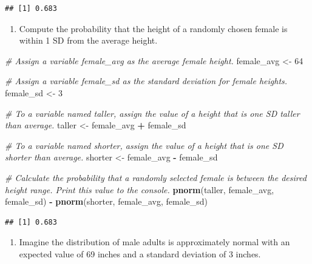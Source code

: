 \documentclass[
]{article}
\newenvironment{Shaded}{\begin{snugshade}}{\end{snugshade}}
\newcommand{\CommentTok}[1]{\textcolor[rgb]{0.56,0.35,0.01}{\textit{#1}}}
\newcommand{\DecValTok}[1]{\textcolor[rgb]{0.00,0.00,0.81}{#1}}
\newcommand{\KeywordTok}[1]{\textcolor[rgb]{0.13,0.29,0.53}{\textbf{#1}}}
\newcommand{\NormalTok}[1]{#1}
\newcommand{\OperatorTok}[1]{\textcolor[rgb]{0.81,0.36,0.00}{\textbf{#1}}}
\newcommand{\StringTok}[1]{\textcolor[rgb]{0.31,0.60,0.02}{#1}}
\providecommand{\tightlist}{%
  \setlength{\itemsep}{0pt}\setlength{\parskip}{0pt}}
\begin{document}
\begin{verbatim}
## [1] 0.683
\end{verbatim}

\begin{enumerate}
\def\labelenumi{\arabic{enumi}.}
\setcounter{enumi}{4}
\tightlist
\item
  Compute the probability that the height of a randomly chosen female is
  within 1 SD from the average height.
\end{enumerate}

\begin{Shaded}
\begin{Highlighting}[]
\CommentTok{\# Assign a variable \textquotesingle{}female\_avg\textquotesingle{} as the average female height.}
\NormalTok{female\_avg \textless{}{-}}\StringTok{ }\DecValTok{64}

\CommentTok{\# Assign a variable \textquotesingle{}female\_sd\textquotesingle{} as the standard deviation for female heights.}
\NormalTok{female\_sd \textless{}{-}}\StringTok{ }\DecValTok{3}

\CommentTok{\# To a variable named \textquotesingle{}taller\textquotesingle{}, assign the value of a height that is one SD taller than average.}
\NormalTok{taller \textless{}{-}}\StringTok{ }\NormalTok{female\_avg }\OperatorTok{+}\StringTok{ }\NormalTok{female\_sd}

\CommentTok{\# To a variable named \textquotesingle{}shorter\textquotesingle{}, assign the value of a height that is one SD shorter than average.}
\NormalTok{shorter \textless{}{-}}\StringTok{ }\NormalTok{female\_avg }\OperatorTok{{-}}\StringTok{ }\NormalTok{female\_sd}

\CommentTok{\# Calculate the probability that a randomly selected female is between the desired height range. Print this value to the console.}
\KeywordTok{pnorm}\NormalTok{(taller, female\_avg, female\_sd) }\OperatorTok{{-}}\StringTok{ }\KeywordTok{pnorm}\NormalTok{(shorter, female\_avg, female\_sd) }
\end{Highlighting}
\end{Shaded}

\begin{verbatim}
## [1] 0.683
\end{verbatim}

\begin{enumerate}
\def\labelenumi{\arabic{enumi}.}
\setcounter{enumi}{5}
\tightlist
\item
  Imagine the distribution of male adults is approximately normal with
  an expected value of 69 inches and a standard deviation of 3 inches.
\end{enumerate}
\end{document}
